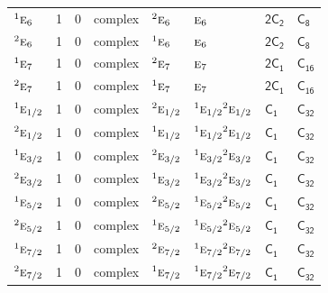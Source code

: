 \documentclass[10pt,a4paper]{article}
\makeatletter
\def\grouprule#1#2{\noalign{\marks\LTgroupmarks{\the\belowrulesep}\nobreak\vskip#1%
  \vskip\aboverulesep}\multispan\LT@cols\unskip{\leaders\hrule\@height#2\hfill\kern\z@}\cr
  \noalign{\penalty\LTrulebreak\vskip\belowrulesep\global\@lastruleclass\z@}}
\numberwithin{equation}{section}
\newcommand{\grp}[1]{\mathsf{#1}}
\newcommand{\irr}[1]{\text{\normalfont\scshape #1}}
\newcommand{\conjpair}[1]{{}^{#1}}
\makeatother
\begin{document}
{\begin{longtable}{@{}lrrlllll@{}}
$\conjpair{1}\irr{e}_{6}$ & 1 & $0$ & complex & $\conjpair{2}\irr{e}_{6}$ & $\irr{e}_{6}$ & \href{2C2.pdf}{$\grp{2C_{2}}$} & \href{../../../rotation/data/pdf/C8.pdf}{$\grp{C_{8}}$}\\
$\conjpair{2}\irr{e}_{6}$ & 1 & $0$ & complex & $\conjpair{1}\irr{e}_{6}$ & $\irr{e}_{6}$ & \href{2C2.pdf}{$\grp{2C_{2}}$} & \href{../../../rotation/data/pdf/C8.pdf}{$\grp{C_{8}}$}\\
$\conjpair{1}\irr{e}_{7}$ & 1 & $0$ & complex & $\conjpair{2}\irr{e}_{7}$ & $\irr{e}_{7}$ & \href{2C1.pdf}{$\grp{2C_{1}}$} & $\grp{C_{16}}$\\
$\conjpair{2}\irr{e}_{7}$ & 1 & $0$ & complex & $\conjpair{1}\irr{e}_{7}$ & $\irr{e}_{7}$ & \href{2C1.pdf}{$\grp{2C_{1}}$} & $\grp{C_{16}}$\\
\grouprule{0pt}{\lightrulewidth}
$\conjpair{1}\irr{e}_{1/2}$ & 1 & $0$ & complex & $\conjpair{2}\irr{e}_{1/2}$ & $\conjpair{1}\irr{e}_{1/2}\conjpair{2}\irr{e}_{1/2}$ & \href{C1.pdf}{$\grp{C_{1}}$} & $\grp{C_{32}}$\\
$\conjpair{2}\irr{e}_{1/2}$ & 1 & $0$ & complex & $\conjpair{1}\irr{e}_{1/2}$ & $\conjpair{1}\irr{e}_{1/2}\conjpair{2}\irr{e}_{1/2}$ & \href{C1.pdf}{$\grp{C_{1}}$} & $\grp{C_{32}}$\\
$\conjpair{1}\irr{e}_{3/2}$ & 1 & $0$ & complex & $\conjpair{2}\irr{e}_{3/2}$ & $\conjpair{1}\irr{e}_{3/2}\conjpair{2}\irr{e}_{3/2}$ & \href{C1.pdf}{$\grp{C_{1}}$} & $\grp{C_{32}}$\\
$\conjpair{2}\irr{e}_{3/2}$ & 1 & $0$ & complex & $\conjpair{1}\irr{e}_{3/2}$ & $\conjpair{1}\irr{e}_{3/2}\conjpair{2}\irr{e}_{3/2}$ & \href{C1.pdf}{$\grp{C_{1}}$} & $\grp{C_{32}}$\\
$\conjpair{1}\irr{e}_{5/2}$ & 1 & $0$ & complex & $\conjpair{2}\irr{e}_{5/2}$ & $\conjpair{1}\irr{e}_{5/2}\conjpair{2}\irr{e}_{5/2}$ & \href{C1.pdf}{$\grp{C_{1}}$} & $\grp{C_{32}}$\\
$\conjpair{2}\irr{e}_{5/2}$ & 1 & $0$ & complex & $\conjpair{1}\irr{e}_{5/2}$ & $\conjpair{1}\irr{e}_{5/2}\conjpair{2}\irr{e}_{5/2}$ & \href{C1.pdf}{$\grp{C_{1}}$} & $\grp{C_{32}}$\\
$\conjpair{1}\irr{e}_{7/2}$ & 1 & $0$ & complex & $\conjpair{2}\irr{e}_{7/2}$ & $\conjpair{1}\irr{e}_{7/2}\conjpair{2}\irr{e}_{7/2}$ & \href{C1.pdf}{$\grp{C_{1}}$} & $\grp{C_{32}}$\\
$\conjpair{2}\irr{e}_{7/2}$ & 1 & $0$ & complex & $\conjpair{1}\irr{e}_{7/2}$ & $\conjpair{1}\irr{e}_{7/2}\conjpair{2}\irr{e}_{7/2}$ & \href{C1.pdf}{$\grp{C_{1}}$} & $\grp{C_{32}}$\\

\end{longtable}}
\end{document}
